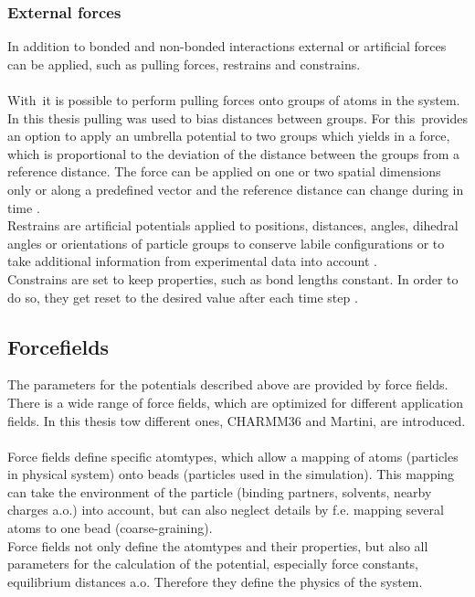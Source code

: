 \subsubsection{External forces}
In addition to bonded and non-bonded interactions external or artificial forces can be applied, such as pulling forces, restrains and constrains.\\
\\
With \gromacs\,it is possible to perform pulling forces onto groups of atoms in the system. In this thesis pulling was used to bias distances between groups. For this \gromacs\,provides an option to apply an umbrella potential to two groups which yields in a force, which is proportional to the deviation of the distance between the groups from a reference distance. The force can be applied on one or two spatial dimensions only or along a predefined vector and the reference distance can change during in time  \autocite[p. 154-159]{gromacsManual}.\\
Restrains are artificial potentials applied to positions, distances, angles, dihedral angles or orientations of particle groups to conserve labile configurations or to take additional information from experimental data into account \autocite[p. 84f]{gromacsManual}.\\
Constrains are set to keep properties, such as bond lengths constant. In order to do so, they get reset to the desired value after each time step \autocite[p. 44f]{gromacsManual}. %
\subsection{Forcefields}
The parameters for the potentials described above are provided by force fields. There is a wide range of force fields, which are optimized for different application fields. In this thesis tow different ones, CHARMM36 and Martini, are introduced.\\
\\
Force fields define specific atomtypes, which allow a mapping of atoms (particles in physical system) onto beads (particles used in the simulation). This mapping can take the environment of the particle (binding partners, solvents, nearby charges a.o.) into account, but can also neglect details by f.e. mapping several atoms to one bead (coarse-graining).\\
Force fields not only define the atomtypes and their properties, but also all parameters for the calculation of the potential, especially force constants, equilibrium distances a.o. Therefore they define the physics of the system.
